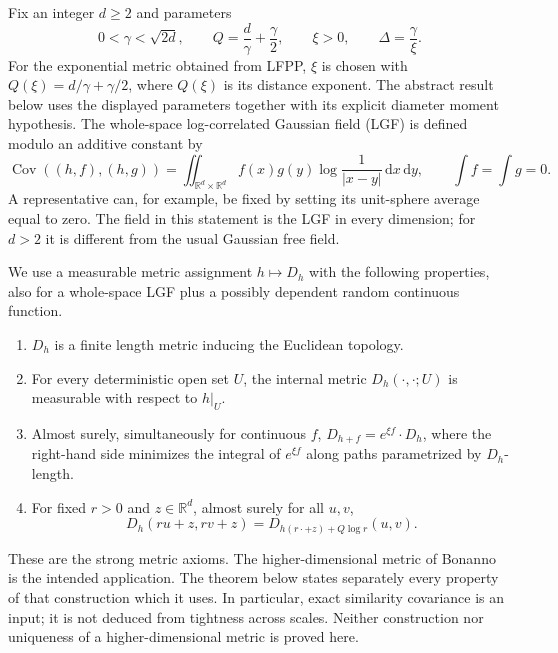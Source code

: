 \documentclass[11pt,letterpaper]{article}
\newcommand{\R}{\mathbb R}
\newcommand{\dd}{\,\mathrm d}
\DeclareMathOperator{\Cov}{Cov}
\theoremstyle{definition}
\theoremstyle{remark}
\numberwithin{equation}{section}
\begin{document}
Fix an integer $d\ge2$ and parameters
\begin{equation}\label{eq:parameters}
  0<\gamma<\sqrt{2d},\qquad
  Q=\frac d\gamma+\frac\gamma2,\qquad
  \xi>0,\qquad \Delta=\frac\gamma\xi.
\end{equation}
For the exponential metric obtained from LFPP, $\xi$ is chosen with $Q(\xi)=d/\gamma+\gamma/2$, where $Q(\xi)$ is its distance exponent. The abstract result below uses the displayed parameters together with its explicit diameter moment hypothesis. The whole-space log-correlated Gaussian field (LGF) is defined modulo an additive constant by
\begin{equation*}
 \Cov((h,f),(h,g))
 =\iint_{\R^d\times\R^d} f(x)g(y)\log\frac1{|x-y|}\dd x\dd y,
 \qquad \int f=\int g=0.
\end{equation*}
A representative can, for example, be fixed by setting its unit-sphere average equal to zero. The field in this statement is the LGF in every dimension; for $d>2$ it is different from the usual Gaussian free field.

We use a measurable metric assignment $h\mapsto D_h$ with the following properties, also for a whole-space LGF plus a possibly dependent random continuous function.
\begin{enumerate}[label=(\roman*)]
\item $D_h$ is a finite length metric inducing the Euclidean topology.
\item For every deterministic open set $U$, the internal metric
$D_h(\cdot,\cdot;U)$ is measurable with respect to $h|_U$.
\item Almost surely, simultaneously for continuous $f$,
$D_{h+f}=e^{\xi f}\cdot D_h$, where the right-hand side minimizes the integral of $e^{\xi f}$ along paths parametrized by $D_h$-length.
\item For fixed $r>0$ and $z\in\R^d$, almost surely for all $u,v$,
\begin{equation}\label{eq:similarity}
 D_h(ru+z,rv+z)
 =D_{h(r\cdot+z)+Q\log r}(u,v).
\end{equation}
\end{enumerate}
These are the strong metric axioms. The higher-dimensional metric of Bonanno~\cite{Bonanno} is the intended application. The theorem below states separately every property of that construction which it uses. In particular, exact similarity covariance is an input; it is not deduced from tightness across scales. Neither construction nor uniqueness of a higher-dimensional metric is proved here.
\end{document}
